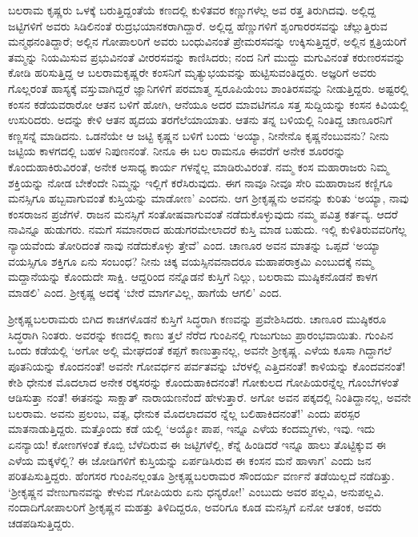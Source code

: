 ಬಲರಾಮ ಕೃಷ್ಣರು ಒಳಕ್ಕೆ ಬರುತ್ತಿದ್ದಂತೆಯೆ ಕಣದಲ್ಲಿ ಕುಳಿತವರ ಕಣ್ಣುಗಳೆಲ್ಲ ಅವ ರತ್ತ ತಿರುಗಿದವು. ಅಲ್ಲಿದ್ದ ಜಟ್ಟಿಗಳಿಗೆ ಅವರು ಸಿಡಿಲಿನಂತೆ ರುದ್ರಭಯಾನಕರಾಗಿದ್ದಾರೆ. ಅಲ್ಲಿದ್ದ ಹೆಣ್ಣುಗಳಿಗೆ ಶೃಂಗಾರರಸವನ್ನು ಚೆಲ್ಲುತ್ತಿರುವ ಮನ್ಮಥನಂತಿದ್ದಾರೆ; ಅಲ್ಲಿನ ಗೋಪಾಲರಿಗೆ ಅವರು ಬಂಧುವಿನಂತೆ ಪ್ರೇಮರಸವನ್ನು ಉಕ್ಕಿಸುತ್ತಿದ್ದರೆ, ಅಲ್ಲಿನ ಕ್ಷತ್ರಿಯರಿಗೆ ತಮ್ಮನ್ನು ನಿಯಮಿಸುವ ಪ್ರಭುವಿನಂತೆ ವೀರರಸವನ್ನು ಕಾಣಿಸಿದರು; ನಂದ ನಿಗೆ ಮುದ್ದು ಮಗುವಿನಂತೆ ಕರುಣರಸವನ್ನು ಕೋಡಿ ಹರಿಸುತ್ತಿದ್ದ ಆ ಬಲರಾಮಕೃಷ್ಣರೇ ಕಂಸನಿಗೆ ಮೃತ್ಯುಭಯವನ್ನು ಹುಟ್ಟಿಸುವಂತಿದ್ದರು. ಅಜ್ಞರಿಗೆ ಅವರು ಗೊಲ್ಲರಂತೆ ಹಾಸ್ಯಕ್ಕೆ ವಸ್ತುವಾಗಿದ್ದರೆ ಜ್ಞಾನಿಗಳಿಗೆ ಪರಮಾತ್ಮ ಸ್ವರೂಪಿಯೆಂಬ ಶಾಂತಿರಸವನ್ನು ನೀಡುತ್ತಿದ್ದರು. ಅಷ್ಟರಲ್ಲಿ ಕಂಸನ ಕಡೆಯವರಾರೋ ಆತನ ಬಳಿಗೆ ಹೋಗಿ, ಆನೆಯೂ ಅದರ ಮಾವಟಿಗನೂ ಸತ್ತ ಸುದ್ದಿಯನ್ನು ಕಂಸನ ಕಿವಿಯಲ್ಲಿ ಉಸುರಿದರು. ಅದನ್ನು ಕೇಳಿ ಆತನ ಹೃದಯ ತರಗೆಲೆಯಾಯಾತು. ಆತನು ತನ್ನ ಬಳಿಯಲ್ಲಿ ನಿಂತಿದ್ದ ಚಾಣೂರನಿಗೆ ಕಣ್ಣಸನ್ನೆ ಮಾಡಿದನು. ಒಡನೆಯೇ ಆ ಜಟ್ಟಿ ಕೃಷ್ಣನ ಬಳಿಗೆ ಬಂದು ‘ಅಯ್ಯಾ, ನೀನೇನೊ ಕೃಷ್ಣನೆಂಬುವನು? ನೀನು ಜಟ್ಟಿಯ ಕಾಳಗದಲ್ಲಿ ಬಹಳ ನಿಪುಣನಂತೆ. ನೀನೂ ಈ ಬಲ ರಾಮನೂ ಈವರೆಗೆ ಅನೇಕ ಶೂರರನ್ನು ಕೊಂದುಹಾಕಿರುವಿರಂತೆ, ಅನೇಕ ಅಸಾಧ್ಯ ಕಾರ್ಯ ಗಳನ್ನೆಲ್ಲ ಮಾಡಿರುವಿರಂತೆ. ನಮ್ಮ ಕಂಸ ಮಹಾರಾಜರು ನಿಮ್ಮ ಶಕ್ತಿಯನ್ನು ನೋಡ ಬೇಕೆಂದೇ ನಿಮ್ಮನ್ನು ಇಲ್ಲಿಗೆ ಕರೆಸಿರುವುದು. ಈಗ ನಾವೂ ನೀವೂ ಸೇರಿ ಮಹಾರಾಜನ ಕಣ್ಣಿಗೂ ಮನಸ್ಸಿಗೂ ಹಬ್ಬವಾಗುವಂತೆ ಕುಸ್ತಿಯನ್ನು ಮಾಡೋಣ’ ಎಂದನು. ಆಗ ಶ್ರೀಕೃಷ್ಣನು ಅವನನ್ನು ಕುರಿತು ‘ಅಯ್ಯಾ, ನಾವು ಕಂಸರಾಜನ ಪ್ರಜೆಗಳೆ. ರಾಜನ ಮನಸ್ಸಿಗೆ ಸಂತೋಷವಾಗುವಂತೆ ನಡೆದುಕೊಳ್ಳುವುದು ನಮ್ಮ ಪವಿತ್ರ ಕರ್ತವ್ಯ. ಆದರೆ ನಾವಿನ್ನೂ ಹುಡುಗರು. ನಮಗೆ ಸಮಾನರಾದ ಹುಡುಗರಮೇಲಾದರೆ ಕುಸ್ತಿ ಮಾಡ ಬಹುದು. ಇಲ್ಲಿ ಕುಳಿತಿರುವವರಿಗೆಲ್ಲ ನ್ಯಾಯವೆಂದು ತೋರಿದಂತೆ ನಾವು ನಡೆದುಕೊಳ್ಳು ತ್ತೇವೆ’ ಎಂದ. ಚಾಣೂರ ಅವನ ಮಾತನ್ನು ಒಪ್ಪದೆ ‘ಅಯ್ಯಾ ವಯಸ್ಸಿಗೂ ಶಕ್ತಿಗೂ ಏನು ಸಂಬಂಧ? ನೀನು ಚಿಕ್ಕ ವಯಸ್ಸಿನವನಾದರೂ ಮಹಾಪರಾಕ್ರಮಿ ಎಂಬುದಕ್ಕೆ ನಮ್ಮ ಮದ್ದಾನೆಯನ್ನು ಕೊಂದುದೇ ಸಾಕ್ಷಿ. ಆದ್ದರಿಂದ ನನ್ನೊಡನೆ ಕುಸ್ತಿಗೆ ನಿಲ್ಲು, ಬಲರಾಮ ಮುಷ್ಠಿಕನೊಡನೆ ಕಾಳಗ ಮಾಡಲಿ’ ಎಂದ. ಶ್ರೀಕೃಷ್ಣ ಅದಕ್ಕೆ ‘ಬೇರೆ ಮಾರ್ಗವಿಲ್ಲ, ಹಾಗೆಯೆ ಆಗಲಿ’ ಎಂದ.

ಶ್ರೀಕೃಷ್ಣಬಲರಾಮರು ಬಿಗಿದ ಕಾಚಗಳೊಡನೆ ಕುಸ್ತಿಗೆ ಸಿದ್ಧರಾಗಿ ಕಣವನ್ನು ಪ್ರವೇಶಿಸಿದರು. ಚಾಣೂರ ಮುಷ್ಠಿಕರೂ ಸಿದ್ಧರಾಗಿ ನಿಂತರು. ಅವರನ್ನು ಕಣದಲ್ಲಿ ಕಾಣು ತ್ತಲೆ ನೆರೆದ ಗುಂಪಿನಲ್ಲಿ ಗುಜುಗುಜು ಪ್ರಾರಂಭವಾಯಿತು. ಗುಂಪಿನ ಒಂದು ಕಡೆಯಲ್ಲಿ ‘ಅಗೋ ಅಲ್ಲಿ ಮೇಘದಂತೆ ಕಪ್ಪಗೆ ಕಾಣುತ್ತಾನಲ್ಲ, ಅವನೇ ಶ್ರೀಕೃಷ್ಣ. ಎಳೆಯ ಕೂಸಾ ಗಿದ್ದಾಗಲೆ ಪೂತನಿಯನ್ನು ಕೊಂದನಂತೆ! ಅವನೇ ಗೋವರ್ಧನ ಪರ್ವತವನ್ನು ಬೆರಳಲ್ಲಿ ಎತ್ತಿದನಂತೆ! ಕಾಳಿಯನ್ನು ಕೊಂದವನಂತೆ! ಕೇಶಿ ಧೇನುಕ ಮೊದಲಾದ ಅನೇಕ ರಕ್ಕಸರನ್ನು ಕೊಂದುಹಾಕಿದನಂತೆ! ಗೋಕುಲದ ಗೋಪಿಯರನ್ನೆಲ್ಲ ಗೊಂಬೆಗಳಂತೆ ಆಡಿಸುತ್ತಾ ನಂತೆ! ಈತನನ್ನು ಸಾಕ್ಷಾತ್ ನಾರಾಯಣನೆಂದೆ ಹೇಳುತ್ತಾರೆ. ಅಗೋ ಅವನ ಪಕ್ಕದಲ್ಲಿ ನಿಂತಿದ್ದಾನಲ್ಲ, ಅವನೇ ಬಲರಾಮ. ಅವನು ಪ್ರಲಂಬ, ವತ್ಸ, ಧೇನುಕ ಮೊದಲಾದವರ ನ್ನೆಲ್ಲ ಬಲಿಹಾಕಿದನಂತೆ!’ ಎಂದು ಪರಸ್ಪರ ಮಾತನಾಡುತ್ತಿದ್ದರು. ಮತ್ತೊಂದು ಕಡೆ ಯಲ್ಲಿ ‘ಅಯ್ಯೋ ಪಾಪ, ಇನ್ನೂ ಎಳೆಯ ಕಂದಮ್ಮಗಳು, ಇವು. ಇದು ಏನನ್ಯಾಯ! ಕೋಣಗಳಂತೆ ಕೊಬ್ಬಿ ಬೆಳೆದಿರುವ ಈ ಜಟ್ಟಿಗಳೆಲ್ಲಿ, ಕೆನ್ನೆ ಹಿಂಡಿದರೆ ಇನ್ನೂ ಹಾಲು ತೊಟ್ಟಿಕ್ಕುವ ಈ ಎಳೆಯ ಮಕ್ಕಳೆಲ್ಲಿ? ಈ ಜೋಡಿಗಳಿಗೆ ಕುಸ್ತಿಯನ್ನು ಏರ್ಪಡಿಸಿರುವ ಈ ಕಂಸನ ಮನೆ ಹಾಳಾಗ’ ಎಂದು ಜನ ಪರಿತಪಿಸುತ್ತಿದ್ದರು. ಹೆಂಗಸರ ಗುಂಪಿನಲ್ಲಂತೂ ಶ್ರೀಕೃಷ್ಣಬಲರಾಮರ ಸೌಂದರ್ಯ ವರ್ಣನೆ ತಡೆಯಿಲ್ಲದೆ ನಡೆದಿತ್ತು. ‘ಶ್ರೀಕೃಷ್ಣನ ವೇಣುಗಾನವನ್ನು ಕೇಳುವ ಗೋಪಿಯರು ಏನು ಧನ್ಯರೋ!’ ಎಂಬುದು ಅವರ ಪಲ್ಲವಿ, ಅನುಪಲ್ಲವಿ. ನಂದಾದಿಗೋಪಾಲರಿಗೆ ಶ್ರೀಕೃಷ್ಣನ ಮಹತ್ತು ತಿಳಿದಿದ್ದರೂ, ಅವರಿಗೂ ಕೂಡ ಮನಸ್ಸಿಗೆ ಏನೋ ಆತಂಕ, ಅವರು ಚಡಪಡಿಸುತ್ತಿದ್ದರು.

